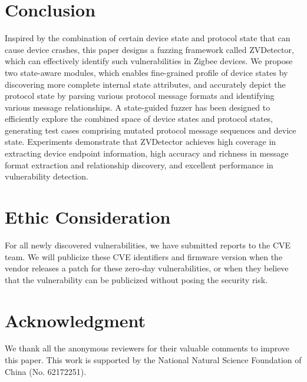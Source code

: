 \documentclass[10pt,journal,compsoc]{IEEEtran}
\begin{document}
\section{Conclusion}
Inspired by the combination of certain device state and protocol state that can cause device crashes, this paper designs a fuzzing framework called ZVDetector, which can effectively identify such vulnerabilities in Zigbee devices. We propose two state-aware modules, which enables fine-grained profile of device states by discovering more complete internal state attributes, and accurately depict the protocol state by parsing various protocol message formats and identifying various message relationships. A state-guided fuzzer has been designed to efficiently explore the combined space of device states and protocol states, generating test cases comprising mutated protocol message sequences and device state. Experiments demonstrate that ZVDetector achieves high coverage in extracting device endpoint information, high accuracy and richness in message format extraction and relationship discovery, and excellent performance in vulnerability detection.


\section*{Ethic Consideration}
For all newly discovered vulnerabilities, we have submitted reports to the CVE team. We will publicize these CVE identifiers and firmware version when the vendor releases a patch for these zero-day vulnerabilities, or when they believe that the vulnerability can be publicized without posing the security risk. 

\section*{Acknowledgment}

We thank all the anonymous reviewers for their valuable comments to improve this
paper. This work is supported by the National Natural Science Foundation of China (No. 62172251).


\balance


\appendices
\end{document}
